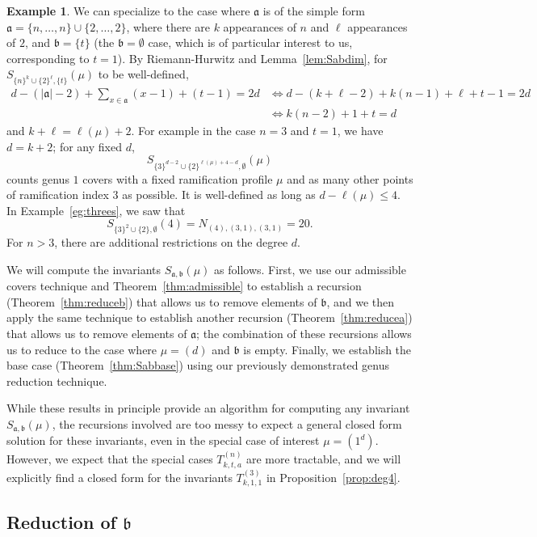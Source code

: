 \documentclass[11pt]{article}           %
\renewcommand{\a}{\mathfrak a}
\renewcommand{\b}{\mathfrak b}
\theoremstyle{definition}
\newtheorem{eg}{Example}[section]
\begin{document}
\begin{eg}
  \label{eg:Sabns}
  We can specialize to the case where $\a$ is of the simple form
  $\a=\{n,\dots,n\}\cup\{2,\dots,2\}$, where there are $k$ appearances
  of $n$ and $\ell$ appearances of $2$, and $\b=\{t\}$ (the $\b=\emptyset$
  case, which is of particular interest to us, corresponding to $t=1$).
  By Riemann-Hurwitz and Lemma~\ref{lem:Sabdim}, for
  $S_{\{n\}^k\cup\{2\}^{\ell},\{t\}}(\mu)$ to be well-defined,
  \begin{align*}
    d-(|\a|-2)+\sum_{x\in\a}(x-1)+(t-1)=2d &\iff d-(k+\ell-2)+k(n-1)+\ell+t-1=2d \\
    &\iff k(n-2)+1+t=d
  \end{align*}
  and $k+\ell=\ell(\mu)+2$.
  For example in the case $n=3$ and $t=1$, we have $d=k+2$; for any fixed $d$,
  \[S_{\{3\}^{d-2}\cup\{2\}^{\ell(\mu)+4-d},\emptyset}(\mu)\] counts genus $1$ covers
  with a fixed ramification profile $\mu$ and as many other
  points of ramification index $3$ as possible. It is well-defined
  as long as $d-\ell(\mu)\leq 4$.
  In Example~\ref{eg:threes}, we saw that
  \[
  S_{\{3\}^2\cup\{2\},\emptyset}(4)=N_{(4),(3,1),(3,1)}=20.
  \]
  For $n>3$, there are additional
  restrictions on the degree $d$.
  \end{eg}

We will compute the invariants $S_{\a,\b}(\mu)$ as follows. First,
we use our admissible covers technique
and Theorem~\ref{thm:admissible} to establish a recursion (Theorem~\ref{thm:reduceb}) that allows us to remove elements of
$\b$, and we then apply the same
technique to establish another recursion (Theorem~\ref{thm:reducea}) that allows us to remove elements of $\a$; the combination
of these recursions allows us to reduce to the case where $\mu=(d)$ and $\b$ is empty. Finally,
we establish the base case (Theorem~\ref{thm:Sabbase}) using our previously demonstrated genus reduction technique.

While these results in principle provide an algorithm for computing any invariant
$S_{\a,\b}(\mu)$, the recursions involved are too messy to expect a general closed
form solution for these invariants,
even in the special case of interest $\mu=(1^d)$. However, we expect that the special cases
$T_{k,t,a}^{(n)}$ are more tractable, and we will explicitly find a closed form
for the invariants $T_{k,1,1}^{(3)}$ in Proposition~\ref{prop:deg4}.

\subsection{Reduction of $\b$}
\end{document}

